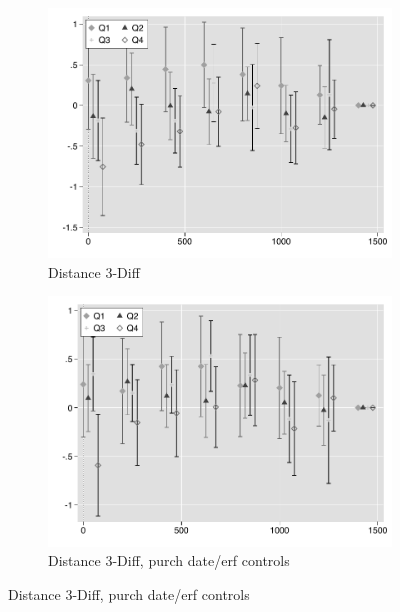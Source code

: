 \documentclass[12pt]{article}
\begin{document}
\begin{figure}
        \centering
   \caption[ Prices over distance ]
    {\small Prices over distance} 
        \begin{subfigure}[b]{0.48\textwidth}
                    \caption[Network2]%
            {{\footnotesize Distance 3-Diff}}    
            \label{fig:prefor}
            \centering
            \includegraphics[width=\textwidth,trim={0.3cm .3cm 0.1cm 0cm}, clip=true]{figures/price_dist_3d_no_ctrl_q}
        \end{subfigure}
        \hfill
        \begin{subfigure}[b]{0.48\textwidth}
                    \caption[Network2]%
            {{\footnotesize Distance 3-Diff, purch date/erf controls}}    
            \label{fig:prefor}
            \centering
            \includegraphics[width=\textwidth,trim={0.3cm .3cm 0.1cm 0cm}, clip=true]{figures/price_dist_3d_ctrl_q}

\end{subfigure}
\end{figure}
\end{document}

